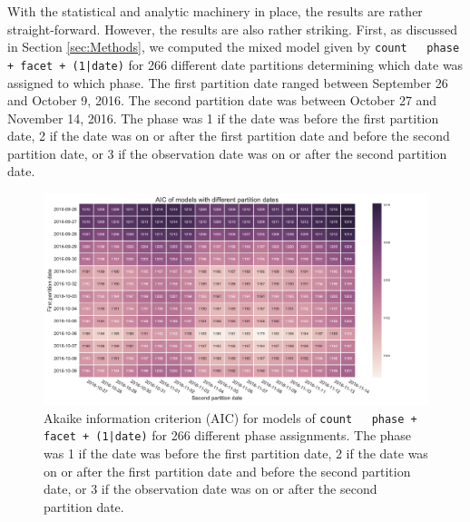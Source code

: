 With the statistical and analytic machinery in place, the results are 
rather straight-forward. However, the results are also rather striking. 
First, as discussed in Section \ref{sec:Methods}, we computed the mixed model
given by \texttt{count ~ phase + facet + (1|date)} for 266 different date
partitions determining which date was assigned to which phase. The first
partition date ranged between September 26 and October 9, 2016. The
second partition date was between October 27 and November 14, 2016.
The phase was 1 if the date was before the first partition date, 2 if the 
date was on or after the first partition date and before the 
second partition date, or 3 if the observation date was on or after the second 
partition date.


\begin{figure}
  \centering
  \hspace*{-.25in}
  \includegraphics[width=1.25\textwidth]{figures/AIC_dates-FIG2.pdf}

\caption{
  Akaike information criterion (AIC) for models of \texttt{count ~ phase + facet + (1|date)}
  for 266 different phase assignments. The phase was 1 if the date was before
  the first partition date, 2 if the date was on or after
  the first partition date and before the second partition date, or
  3 if the observation date was on or after the second partition date.
}
\label{fig:AICs}
\end{figure}


